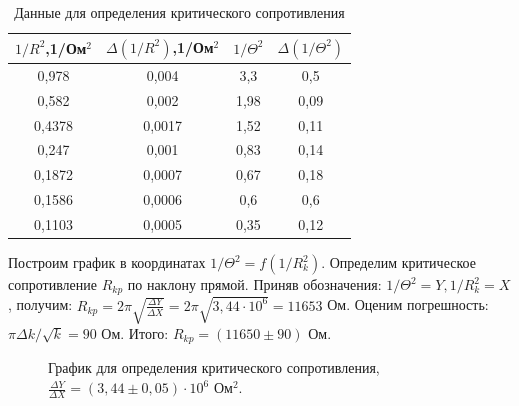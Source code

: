 \documentclass[a4paper,12pt]{article}
\begin{document}
\begin{table} [h!]
	\centering
	\caption{ Данные для определения критического сопротивления }
	\begin{tabular}{|c|c|c|c|}
		\hline 
		$1/R^2$,1/Ом$^2$ & $\Delta (1/R^2)$,1/Ом$^2$ & $1/\Theta^2$ & $\Delta (1/\Theta^2)$ \\ 
		\hline 
		0,978 & 0,004 & 3,3 & 0,5 \\ 
		\hline 
		0,582 & 0,002 & 1,98 & 0,09 \\ 
		\hline 
		0,4378 & 0,0017 & 1,52 & 0,11 \\ 
		\hline 
		0,247 & 0,001 & 0,83 & 0,14 \\ 
		\hline 
		0,1872 & 0,0007 & 0,67 & 0,18 \\ 
		\hline 
		0,1586 & 0,0006 & 0,6 & 0,6 \\ 
		\hline 
		0,1103 & 0,0005 & 0,35 & 0,12 \\ 
		\hline 
	\end{tabular} 
	
\end{table}

\par Построим график в координатах $1/\Theta^2 = f(1/R^2_k)$. Определим критическое сопротивление $R_{kp}$ по наклону прямой. Приняв обозначения: $1/\Theta^2 = Y, 1/R^2_k = X$, получим: $R_{kp} = 2\pi \sqrt{\frac{\Delta Y}{\Delta X}} =  2\pi \sqrt{3,44 \cdot 10^6} = 11653$ Ом. Оценим погрешность: $\pi \Delta k / \sqrt{k} = 90$ Ом. Итого: $R_{kp} = (11650 \pm 90)$ Ом.

\begin{figure}
	\centering
	\caption{График для определения критического сопротивления, $\frac{\Delta Y}{\Delta X} = (3,44 \pm 0,05)\cdot 10^6$ Ом$^2$.}
	\label{mah}
\end{figure}
\end{document}
